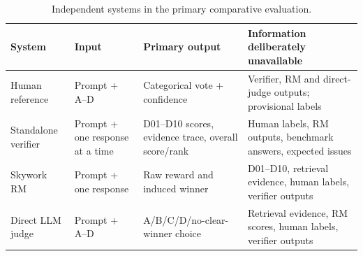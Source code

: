 \begin{table}[htbp]
\centering
\footnotesize
\setlength{\tabcolsep}{3pt}
\renewcommand{\arraystretch}{1.08}
\caption{Independent systems in the primary comparative evaluation.}
\label{tab:evaluation-systems}
\begin{tabularx}{\textwidth}{p{3.0cm}p{2.6cm}p{2.5cm}X}
\toprule
\textbf{System} & \textbf{Input} & \textbf{Primary output} & \textbf{Information deliberately unavailable} \\
\midrule
Human reference & Prompt + A--D & Categorical vote + confidence & Verifier, RM and direct-judge outputs; provisional labels \\
Standalone verifier & Prompt + one response at a time & D01--D10 scores, evidence trace, overall score/rank & Human labels, RM outputs, benchmark answers, expected issues \\
Skywork RM & Prompt + one response & Raw reward and induced winner & D01--D10, retrieval evidence, human labels, verifier outputs \\
Direct LLM judge & Prompt + A--D & A/B/C/D/no-clear-winner choice & Retrieval evidence, RM scores, human labels, verifier outputs \\
\bottomrule
\end{tabularx}
\end{table}
